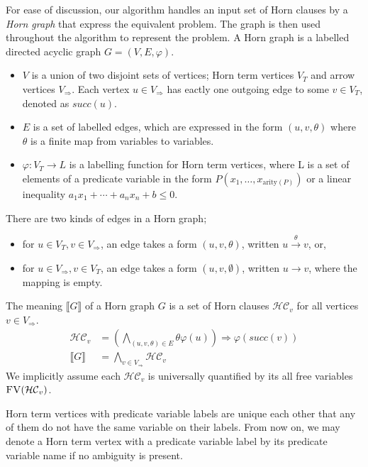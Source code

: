 \documentclass[a4paper,12pt]{article}
\newcommand{\edge}[2]{#1\rightarrow#2}
\newcommand{\edgel}[3]{#1\xrightarrow{#2}#3}
\begin{document}
For ease of discussion, our algorithm handles an input set of Horn
clauses by a \emph{Horn graph} that express the equivalent problem.
The graph is then used throughout the algorithm to represent the
problem.  A Horn graph is a labelled directed acyclic graph
$G=(V,E,\varphi)$.
\begin{itemize}
\item $V$ is a union of two disjoint sets of vertices; Horn term
  vertices $V_T$ and arrow vertices $V_\Rightarrow$.  Each vertex $u
  \in V_\Rightarrow$ has eactly one outgoing edge to some $v \in V_T$,
  denoted as $succ(u)$.
\item $E$ is a set of labelled edges, which are expressed in the form
  $(u,v,\theta)$ where $\theta$ is a finite map from variables to
  variables.
\item $\varphi: V_T \rightarrow L$ is a labelling function for Horn
  term vertices, where L is a set of elements of a predicate variable
  in the form $P(x_1, \ldots, x_{\mathrm{arity}(P)})$ or a linear
  inequality $a_1 x_1 + \cdots + a_n x_n + b \leq 0$.
\end{itemize}
There are two kinds of edges in a Horn graph;
\begin{itemize}
\item for $u \in V_T, v \in V_\Rightarrow$, an edge takes a form
  $(u,v,\theta)$, written $\edgel{u}{\theta}{v}$, or,
\item for $u \in V_\Rightarrow, v \in V_T$, an edge takes a form
  $(u,v,\emptyset)$, written $\edge{u}{v}$, where the mapping is
  empty.
\end{itemize}
The meaning $\llbracket G \rrbracket $ of a Horn graph $G$ is a set of
Horn clauses $\mathcal{HC}_v$ for all vertices $v \in V_\Rightarrow$.
\begin{align*}
\mathcal{HC}_v & = \left( \bigwedge_{(u,v,\theta) \in E} \theta \varphi(u) \right) \Longrightarrow \varphi(succ(v)) \\
\llbracket G \rrbracket & = \bigwedge_{v \in V_\Rightarrow} \mathcal{HC}_v
\end{align*}
We implicitly assume each $\mathcal{HC}_v$ is universally quantified
by its all free variables $\textsc{FV}(\mathcal{HC}_v)$.

Horn term vertices with predicate variable labels are unique each
other that any of them do not have the same variable on their labels.
From now on, we may denote a Horn term vertex with a predicate
variable label by its predicate variable name if no ambiguity is
present.
\end{document}
